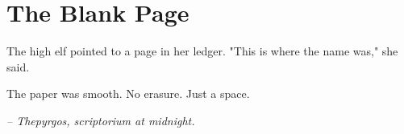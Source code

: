 \chapter*{The Blank Page}

The high elf pointed to a page in her ledger. "This is where the name was," she said.

The paper was smooth. No erasure. Just a space.

\smallskip

\noindent \textit{-- Thepyrgos, scriptorium at midnight.}

